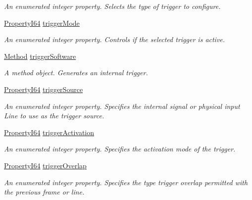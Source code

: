 \begin{DoxyCompactItemize}
\begin{DoxyCompactList}\small\item\em An enumerated integer property. Selects the type of trigger to configure. \end{DoxyCompactList}\item 
\hyperlink{group___common_interface_ga81749b2696755513663492664a18a893}{Property\+I64} \hyperlink{classmv_i_m_p_a_c_t_1_1acquire_1_1_gen_i_cam_1_1_acquisition_control_a42ea8092a767cd62a5b59119d348701b}{trigger\+Mode}
\begin{DoxyCompactList}\small\item\em An enumerated integer property. Controls if the selected trigger is active. \end{DoxyCompactList}\item 
\hyperlink{classmv_i_m_p_a_c_t_1_1acquire_1_1_method}{Method} \hyperlink{classmv_i_m_p_a_c_t_1_1acquire_1_1_gen_i_cam_1_1_acquisition_control_a41d20326d5f933501731f9c9ecbde1f0}{trigger\+Software}
\begin{DoxyCompactList}\small\item\em A method object. Generates an internal trigger. \end{DoxyCompactList}\item 
\hyperlink{group___common_interface_ga81749b2696755513663492664a18a893}{Property\+I64} \hyperlink{classmv_i_m_p_a_c_t_1_1acquire_1_1_gen_i_cam_1_1_acquisition_control_a194c05945e0e60054d7e427c08aba4fe}{trigger\+Source}
\begin{DoxyCompactList}\small\item\em An enumerated integer property. Specifies the internal signal or physical input Line to use as the trigger source. \end{DoxyCompactList}\item 
\hyperlink{group___common_interface_ga81749b2696755513663492664a18a893}{Property\+I64} \hyperlink{classmv_i_m_p_a_c_t_1_1acquire_1_1_gen_i_cam_1_1_acquisition_control_aa99ab36c7369a029d2a7f05c59c3516b}{trigger\+Activation}
\begin{DoxyCompactList}\small\item\em An enumerated integer property. Specifies the activation mode of the trigger. \end{DoxyCompactList}\item 
\hyperlink{group___common_interface_ga81749b2696755513663492664a18a893}{Property\+I64} \hyperlink{classmv_i_m_p_a_c_t_1_1acquire_1_1_gen_i_cam_1_1_acquisition_control_ad24c28a7ee11b61889ba6371c6023231}{trigger\+Overlap}
\begin{DoxyCompactList}\small\item\em An enumerated integer property. Specifies the type trigger overlap permitted with the previous frame or line. \end{DoxyCompactList}\item 

\end{DoxyCompactItemize}
